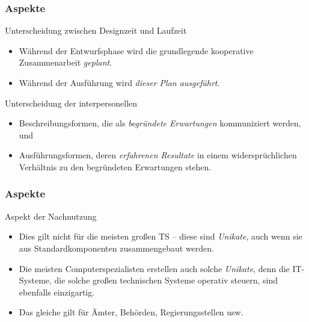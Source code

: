 \documentclass{beamer}
\begin{document}
\begin{frame}\frametitle{Aspekte}
  \begin{block}{Unterscheidung zwischen Designzeit und Laufzeit}
    \begin{itemize}
    \item Während der Entwurfsphase wird die grundlegende kooperative
      Zusammenarbeit \emph{geplant}.
    \item Während der Ausführung wird \emph{dieser Plan ausgeführt}.
    \end{itemize}
  \end{block}
  \begin{block}{Unterscheidung der interpersonellen} 
    \begin{itemize}
    \item Beschreibungsformen, die als \emph{begründete Erwartungen}
      kommuniziert werden, und
    \item Ausführungsformen, deren \emph{erfahrenen Resultate} in einem
      widersprüchlichen Verhältnis zu den begründeten Erwartungen stehen.
    \end{itemize}
  \end{block}
\end{frame}
\begin{frame}\frametitle{Aspekte}
  \begin{block}{Aspekt der Nachnutzung}
    \begin{itemize}
    \item Dies gilt nicht für die meisten großen TS -- diese sind
      \emph{Unikate}, auch wenn sie aus Standardkomponenten zusammengebaut
      werden.
    \item Die meisten Computerspezialisten erstellen auch solche
      \emph{Unikate}, denn die IT-Systeme, die solche großen technischen
      Systeme operativ steuern, sind ebenfalls einzigartig.
    \item Das gleiche gilt für Ämter, Behörden, Regierungsstellen usw.
    \end{itemize}
  \end{block}
\end{frame}
\end{document}
